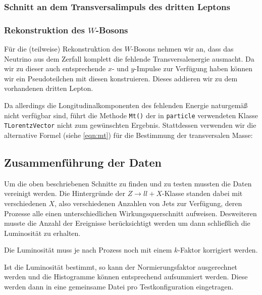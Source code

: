 
\subsubsection{Schnitt an dem Transversalimpuls des dritten Leptons}

\subsubsection{Rekonstruktion des $W$-Bosons}
Für die (teilweise) Rekonstruktion des $W$-Bosons nehmen wir an, dass das
Neutrino aus dem Zerfall komplett die fehlende Transversalenergie ausmacht. Da
wir zu dieser auch entsprechende $x$- und $y$-Impulse zur Verfügung haben können
wir ein Pseudoteilchen mit diesen konstruieren. Dieses addieren wir zu dem
vorhandenen dritten Lepton.

Da allerdings die Longitudinalkomponenten des fehlenden Energie naturgemäß nicht
verfügbar sind, führt die Methode \lstinline'Mt()' der in \lstinline'particle'
verwendeten Klasse \lstinline'TLorentzVector' nicht zum gewünschten Ergebnis.
Stattdessen verwenden wir die alternative Formel (siehe \ref{eqn:mt}) für die
Bestimmung der transversalen Masse:

\subsection{Zusammenführung der Daten}
\label{cha:normierung}
Um die oben beschriebenen Schnitte zu finden und zu testen mussten die Daten
vereinigt werden. Die Hintergründe der $Z\to ll + X$-Klasse standen dabei mit
verschiedenen $X$, also verschiedenen Anzahlen von Jets zur Verfügung, deren
Prozesse alle einen unterschiedlichen Wirkungsquerschnitt aufweisen. Desweiteren
musste die Anzahl der Ereignisse berücksichtigt werden um dann schließlich die
Luminosität zu erhalten.

\begin{table}
  \centering
  \caption{Wirkungsquerschnitte der Hintergründe}
  \label{tab:wqs}
\end{table}

Die Luminosität muss je nach Prozess noch mit einem $k$-Faktor korrigiert
werden.

Ist die Luminosität bestimmt, so kann der Normierungsfaktor ausgerechnet werden
und die Histogramme können entsprechend aufsummiert werden. Diese werden dann in
eine gemeinsame Datei pro Testkonfiguration eingetragen.
